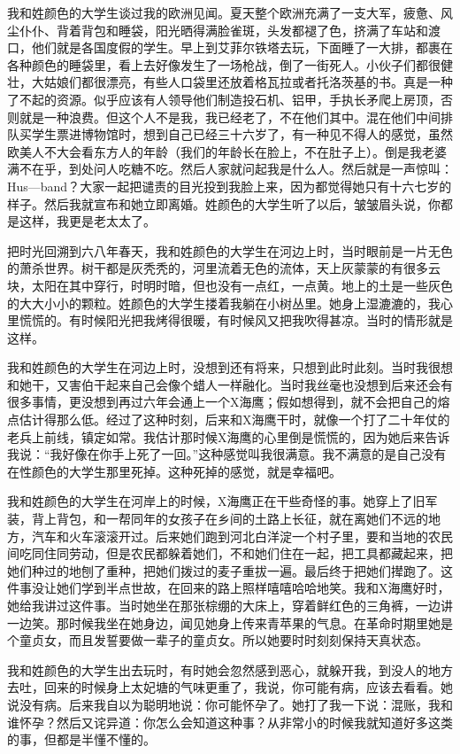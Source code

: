 我和姓颜色的大学生谈过我的欧洲见闻。夏天整个欧洲充满了一支大军，疲惫、风尘仆仆、背着背包和睡袋，阳光晒得满脸雀斑，头发都褪了色，挤满了车站和渡口，他们就是各国度假的学生。早上到艾菲尔铁塔去玩，下面睡了一大排，都裹在各种颜色的睡袋里，看上去好像发生了一场枪战，倒了一街死人。小伙子们都很健壮，大姑娘们都很漂亮，有些人口袋里还放着格瓦拉或者托洛茨基的书。真是一种了不起的资源。似乎应该有人领导他们制造投石机、铝甲，手执长矛爬上房顶，否则就是一种浪费。但这个人不是我，我已经老了，不在他们其中。混在他们中间排队买学生票进博物馆时，想到自己已经三十六岁了，有一种见不得人的感觉，虽然欧美人不大会看东方人的年龄（我们的年龄长在脸上，不在肚子上）。倒是我老婆满不在乎，到处问人吃糖不吃。然后人家就问起我是什么人。然后就是一声惊叫：Hus—band？大家一起把谴责的目光投到我脸上来，因为都觉得她只有十六七岁的样子。然后我就宣布和她立即离婚。姓颜色的大学生听了以后，皱皱眉头说，你都是这样，我更是老太太了。 

把时光回溯到六八年春天，我和姓颜色的大学生在河边上时，当时眼前是一片无色的萧杀世界。树干都是灰秃秃的，河里流着无色的流体，天上灰蒙蒙的有很多云块，太阳在其中穿行，时明时暗，但也没有一点红，一点黄。地上的土是一些灰色的大大小小的颗粒。姓颜色的大学生搂着我躺在小树丛里。她身上湿漉漉的，我心里慌慌的。有时候阳光把我烤得很暖，有时候风又把我吹得甚凉。当时的情形就是这样。 

我和姓颜色的大学生在河边上时，没想到还有将来，只想到此时此刻。当时我很想和她干，又害伯干起来自己会像个蜡人一样融化。当时我丝毫也没想到后来还会有很多事情，更没想到再过六年会通上一个X海鹰；假如想得到，就不会把自己的熔点估计得那么低。经过了这种时刻，后来和X海鹰干时，就像一个打了二十年仗的老兵上前线，镇定如常。我估计那时候X海鹰的心里倒是慌慌的，因为她后来告诉我说：“我好像在你手上死了一回。”这种感觉叫我很满意。我不满意的是自己没有在性颜色的大学生那里死掉。这种死掉的感觉，就是幸福吧。 

我和姓颜色的大学生在河岸上的时候，X海鹰正在干些奇怪的事。她穿上了旧军装，背上背包，和一帮同年的女孩子在乡间的土路上长征，就在离她们不远的地方，汽车和火车滚滚开过。后来她们跑到河北白洋淀一个村子里，要和当地的农民间吃同住同劳动，但是农民都躲着她们，不和她们住在一起，把工具都藏起来，把她们种过的地刨了重种，把她们拨过的麦子重拔一遍。最后终于把她们撵跑了。这件事没让她们学到半点世故，在回来的路上照样嘻嘻哈哈地笑。我和X海鹰好时，她给我讲过这件事。当时她坐在那张棕绷的大床上，穿着鲜红色的三角裤，一边讲一边笑。那时候我坐在她身边，闻见她身上传来青苹果的气息。在革命时期里她是个童贞女，而且发誓要做一辈子的童贞女。所以她要时时刻刻保持天真状态。 

我和姓颜色的大学生出去玩时，有时她会忽然感到恶心，就躲开我，到没人的地方去吐，回来的时候身上太妃塘的气味更重了，我说，你可能有病，应该去看看。她说没有病。后来我自以为聪明地说：你可能怀孕了。她打了我一下说：混账，我和谁怀孕？然后又诧异道：你怎么会知道这种事？从非常小的时候我就知道好多这类的事，但都是半懂不懂的。 

